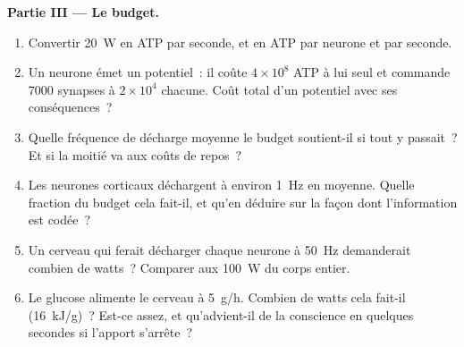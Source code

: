 \begin{problem}
\medskip
\noindent\textbf{Partie III --- Le budget.}
\begin{enumerate}[resume]
  \item Convertir \qty{20}{W} en ATP par seconde, et en ATP par neurone
        et par seconde.
  \item Un neurone émet un potentiel~: il coûte $4\times 10^{8}$ ATP à
        lui seul et commande \num{7000} synapses à $2\times 10^{4}$
        chacune. Coût total d'un potentiel avec ses conséquences~?
  \item Quelle fréquence de décharge moyenne le budget soutient-il si
        tout y passait~? Et si la moitié va aux coûts de repos~?
  \item Les neurones corticaux déchargent à environ \qty{1}{Hz} en
        moyenne. Quelle fraction du budget cela fait-il, et qu'en
        déduire sur la façon dont l'information est codée~?
  \item Un cerveau qui ferait décharger chaque neurone à \qty{50}{Hz}
        demanderait combien de watts~? Comparer aux \qty{100}{W} du
        corps entier.
  \item Le glucose alimente le cerveau à \qty{5}{g/h}. Combien de watts
        cela fait-il (\qty{16}{kJ/g})~? Est-ce assez, et qu'advient-il de
        la conscience en quelques secondes si l'apport s'arrête~?
\end{enumerate}


\end{problem}
